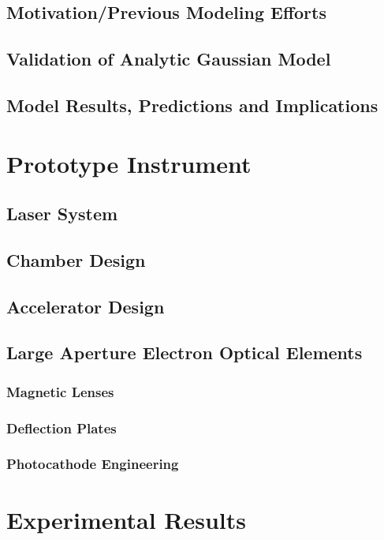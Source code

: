 \documentclass{uicthesi}
\begin{document}
\section{Motivation/Previous Modeling Efforts}





\section{Validation of Analytic Gaussian Model}

\section{Model Results, Predictions and Implications}

\chapter{Prototype Instrument}

\section{Laser System}

\section{Chamber Design}

\section{Accelerator Design}

\section{Large Aperture Electron Optical Elements}

\subsection{Magnetic Lenses}

\subsection{Deflection Plates}

\subsection{Photocathode Engineering}

\chapter{Experimental Results}

 


\end{document}
